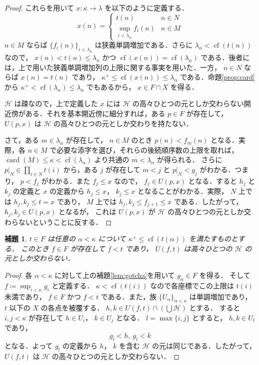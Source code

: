 \documentclass[leqno, 12pt]{ltjsarticle}
\newtheorem{lem}[thm]{補題}
\newcommand{\basicopen}[2]{U(#1,#2)}
\newcommand{\kappasucc}{\kappa^{+}}
\DeclareMathOperator{\card}{card}
\DeclareMathOperator{\cf}{cf}
\begin{document}
\begin{proof}
これらを用いて
$x:\kappa\to \lambda$
を以下のように定義する．
\[
x(n)=
	\begin{cases}
	t(n) &\text{$n\in N$}\\
	\sup_{i<\lambda_{\alpha}}f_{i}(n)& \text{$n\in M$}
	\end{cases}
\]
$n\in M$
ならば
$\{f_{i}(n)\}_{i<\lambda_{\alpha}}$
は狭義単調増加である．さらに
$\lambda_{\alpha}<\cf(t(n))$
なので，
$x(n)<t(n)\le\lambda_{n}$
かつ
$\cf(x(n))=\cf(\lambda_{\alpha})$
である．後者には，上で用いた狭義単調増加列の上限に関する事実を用いた．一方，
$n\in N$
ならば
$x(n)=t(n)$
であり，
$\kappasucc\le\cf(x(n))\le\lambda_{\alpha}$
である．命題\ref{prop:card}から
$\kappasucc<\cf(\lambda_{\alpha})\le\lambda_{\alpha}$
でもあるから，
$x\in F\cap X$
を得る．

$\mathcal{H}$
は疎なので，上で定義した
$x$
には
$\mathcal{H}$
の高々ひとつの元としか交わらない開近傍がある．それを基本開近傍に細分すれば，ある
$p\in F$
が存在して，
$\basicopen{p}{x}$
は
$\mathcal{H}$
の高々ひとつの元としか交わりを持たない．

さて，ある
$m\in \lambda_{\alpha}$
が存在して，
$n\in M$
のとき
$p(n)<f_{m}(n)$
となる．実際，各
$n\in M$
で必要な添字を選び，それらの後続順序数の上限を取れば，
$\card(M)\le\kappa<\cf(\lambda_{\alpha})$
より共通の
$m<\lambda_{\alpha}$
が得られる．
さらに
$p|_{N}\in \prod_{i\in N}t(i)$
から，ある
$j$
が存在して
$m<j$
と
$p|_{N}<g_{j}$
がわかる．つまり，
$p<f_{j}$
がわかる．また
$f_{j}\le x$
なので，
$f_{j}\in \basicopen{p}{x}$
となる．すると
$h_{j}$
と
$k_{j}$
の定義と
$x$
の定義から
$h_{j}\le x$，
$k_{j}\le x$
となることがわかる．実際，
$N$
上では
$h_{j},k_{j}\le t=x$
であり，
$M$
上では
$h_{j},k_{j}\le f_{j+1}\le x$
である．したがって，
$h_{j},k_{j}\in \basicopen{p}{x}$
となるが，
これは
$\basicopen{p}{x}$
が
$\mathcal{H}$
の高々ひとつの元としか交わらないということに反する．
\end{proof}

\begin{lem}\label{lem:ft}
$t\in F$
は任意の
$\alpha<\kappa$
について
$\kappasucc\le \cf(t(\alpha))$
を満たすものとする．
このとき
$f\in F$
が存在して
$f<t$
であり，
$\basicopen{f}{t}$
は高々ひとつの
$\mathcal{H}$
の元としか交わらない．
\end{lem}
\begin{proof}
各
$\alpha<\kappa$
に対して上の補題\ref{lem:gotcha}を用いて
$g_{\alpha}\in F$
を得る．
そして
$f\coloneqq\sup_{i<\kappa}g_{i}$
と定義する．
$\kappa<\cf(t(i))$
なので各座標でこの上限は
$t(i)$
未満であり，
$f\in F$
かつ
$f<t$
である．また，族
$\{U_{\alpha}\}_{\alpha<\kappa}$
は単調増加であり，
$t$
以下の
$X$
の各点を被覆する．
$h,k\in \basicopen{f}{t}\cap(\bigcup\mathcal{H})$
とする．
すると
$i, j<\kappa$
が存在して
$h\in U_{i}$，
$k\in U_{j}$
となる．
$l=\max\{i,j\}$
とすると，
$h, k\in U_{l}$
であり，
\[
g_{l}<h,\ g_{l}<k
\]
となる．よって
$g_{l}$
の定義から
$h$，
$k$
を含む
$\mathcal{H}$
の元は同じである．したがって，
$\basicopen{f}{t}$
は
$\mathcal{H}$
の高々ひとつの元としか交わらない．
\end{proof}
\end{document}
